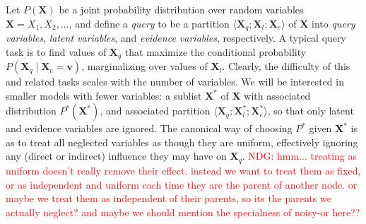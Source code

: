 \documentclass[10pt,letterpaper]{article}
\newcommand{\red}[1]{\textcolor{Red}{#1}}
\begin{document}
Let $P(\textbf{X})$ be a joint probability distribution over random variables $\textbf{X} = X_1,X_2,\dots$, and define a \emph{query} to be a partition $\langle \textbf{X}_q;\textbf{X}_l;\textbf{X}_e\rangle$ of \textbf{X} into \emph{query variables}, \emph{latent variables}, and \emph{evidence variables}, respectively. A typical query task is to find values of $\textbf{X}_q$ that maximize the conditional probability $P(\textbf{X}_q\mid \textbf{X}_e = \textbf{v})$, marginalizing over values of $\textbf{X}_l$. Clearly, the difficulty of this and related tasks scales with the number of variables. We will be interested in smaller models with fewer variables: a sublist $\textbf{X}^*$ of $\textbf{X}$ with associated distribution $P^*(\textbf{X}^*)$, and associated partition $\langle \textbf{X}_q;\textbf{X}_l^*;\textbf{X}_e^*\rangle$, so that only latent and evidence variables are ignored. The canonical way of choosing $P^*$ given $\textbf{X}^*$ is as to treat all neglected variables as though they are uniform, effectively ignoring any (direct or indirect) influence they may have on $\textbf{X}_q$.
\red{NDG: hmm... treating as uniform doesn't really remove their effect. instead we want to treat them as fixed, or as independent and uniform each time they are the parent of another node. or maybe we treat them as independent of their parents, so its the parents we actually neglect? and maybe we should mention the specialness of noisy-or here??}
\end{document}
